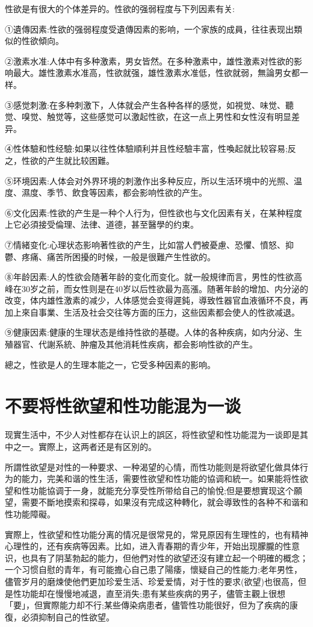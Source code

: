 \documentclass[12pt,UTF8]{ctexbook}
\begin{document}
性欲是有很大的个体差异的。性欲的强弱程度与下列因素有关:

①遺傳因素:性欲的强弱程度受遺傳因素的影响，一个家族的成員，往往表现出類似的性欲傾向。

②激素水准:人体中有多种激素，男女皆然。在多种激素中，雄性激素对性欲的影响最大。雄性激素水准高，性欲就强，雄性激素水准低，性欲就弱，無論男女都一样。

③感觉刺激:在多种刺激下，人体就会产生各种各样的感觉，如視觉、味觉、聽觉、嗅觉、触觉等，这些感觉可以激起性欲，在这一点上男性和女性沒有明显差异。

④性体驗和性经驗:如果以往性体驗順利并且性经驗丰富，性喚起就比较容易;反之，性欲的产生就比较困難。

⑤环境因素:人体会对外界环境的刺激作出多种反应，所以生活环境中的光照、温度、濕度、季节、飲食等因素，都会影响性欲的产生。

⑥文化因素:性欲的产生是一种个人行为，但性欲也与文化因素有关，在某种程度上它必須接受倫理、法律、道德，甚至醫學的约束。

⑦情緒变化:心理状态影响著性欲的产生，比如當人們被憂慮、恐懼、憤怒、抑鬱、疼痛、痛苦所困擾的时候，一般是很難产生性欲的。

⑧年龄因素:人的性欲会随著年龄的变化而变化。就一般規律而言，男性的性欲高峰在30岁之前，而女性则是在40岁以后性欲最为高漲。随著年龄的增加、内分泌的改变，体内雄性激素的减少，人体感觉会变得遲鈍，導致性器官血液循环不良，再加上來自事業、生活及社会交往等方面的压力，这些因素都会使人的性欲减退。

⑨健康因素:健康的生理状态是维持性欲的基礎。人体的各种疾病，如内分泌、生殖器官、代謝系統、肿瘤及其他消耗性疾病，都会影响性欲的产生。

總之，性欲是人的生理本能之一，它受多种因素的影响。

\section{不要将性欲望和性功能混为一谈}

现實生活中，不少人对性都存在认识上的誤区，将性欲望和性功能混为一谈即是其中之一。實際上，这两者还是有区別的。

所謂性欲望是对性的一种要求、一种渴望的心情，而性功能则是将欲望化做具体行为的能力，完美和谐的性生活，需要性欲望和性功能的協调和統一。如果能将性欲望和性功能協调于一身，就能充分享受性所带给自己的愉悅;但是要想實现这个願望，需要不斷地摸索和探尋，如果沒有完成这种轉化，就会導致性的各种不和谐和性功能障礙。

實際上，性欲望和性功能分离的情况是很常見的，常見原因有生理性的，也有精神心理性的，还有疾病等因素。比如，进入青春期的青少年，开始出现朦朧的性意识，也具有了阴茎勃起的能力，但他們对性的欲望还沒有建立起一个明確的概念；一个习惯自慰的青年，有可能擔心自己患了陽痿，懷疑自己的性能力;老年男性，儘管岁月的磨煉使他們更加珍爱生活、珍爱爱情，对于性的要求(欲望)也很高，但是性功能却在慢慢地减退，直至消失;患有某些疾病的男子，儘管主觀上很想「要」，但實際能力却不行;某些傳染病患者，儘管性功能很好，但为了疾病的康復，必須抑制自己的性欲望。
\end{document}
